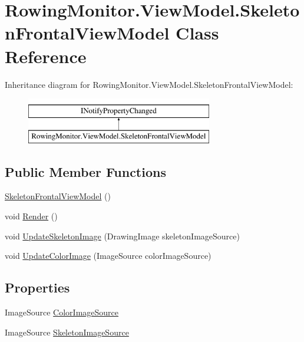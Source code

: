 \hypertarget{class_rowing_monitor_1_1_view_model_1_1_skeleton_frontal_view_model}{}\section{Rowing\+Monitor.\+View\+Model.\+Skeleton\+Frontal\+View\+Model Class Reference}
\label{class_rowing_monitor_1_1_view_model_1_1_skeleton_frontal_view_model}
Inheritance diagram for Rowing\+Monitor.\+View\+Model.\+Skeleton\+Frontal\+View\+Model\+:\begin{figure}[H]
\begin{center}
\leavevmode
\includegraphics[height=2.000000cm]{class_rowing_monitor_1_1_view_model_1_1_skeleton_frontal_view_model}
\end{center}
\end{figure}
\subsection*{Public Member Functions}
\begin{DoxyCompactItemize}
\item 
\hyperlink{class_rowing_monitor_1_1_view_model_1_1_skeleton_frontal_view_model_a44e3840c22cac26b53fc49f5fa590e7e}{Skeleton\+Frontal\+View\+Model} ()
\item 
void \hyperlink{class_rowing_monitor_1_1_view_model_1_1_skeleton_frontal_view_model_a3b92b388570f66ea804bf228560e0406}{Render} ()
\item 
void \hyperlink{class_rowing_monitor_1_1_view_model_1_1_skeleton_frontal_view_model_a4e8bdb2b5d7464ee464fa35a540a7f9c}{Update\+Skeleton\+Image} (Drawing\+Image skeleton\+Image\+Source)
\item 
void \hyperlink{class_rowing_monitor_1_1_view_model_1_1_skeleton_frontal_view_model_a069c37a99bcce8ffa762892987886f19}{Update\+Color\+Image} (Image\+Source color\+Image\+Source)
\end{DoxyCompactItemize}
\subsection*{Properties}
\begin{DoxyCompactItemize}
\item 
Image\+Source \hyperlink{class_rowing_monitor_1_1_view_model_1_1_skeleton_frontal_view_model_a91b53739cf7c3904497a1d9a34fd6962}{Color\+Image\+Source}
\item 
Image\+Source \hyperlink{class_rowing_monitor_1_1_view_model_1_1_skeleton_frontal_view_model_a2ab711486ceab54b30c19cc8a349e3f8}{Skeleton\+Image\+Source}
\end{DoxyCompactItemize}
